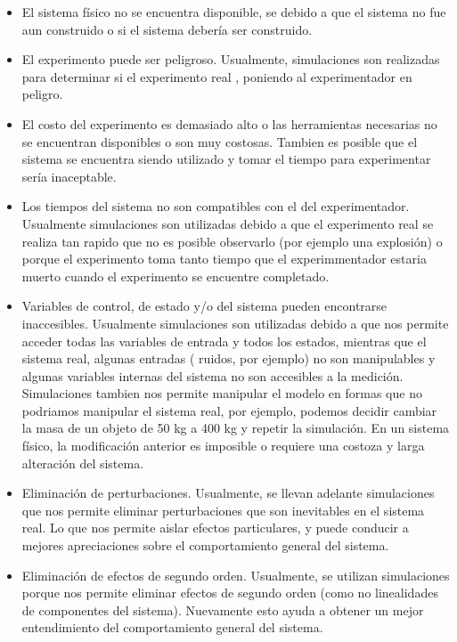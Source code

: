 \begin{itemize}
	\item El sistema físico no se encuentra disponible, se debido a que el sistema no fue aun construido o si el sistema debería ser construido. 
	
	\item El experimento puede ser peligroso. Usualmente, simulaciones son realizadas para determinar si el experimento real , poniendo al experimentador en peligro.

	\item El costo del experimento es demasiado alto o las herramientas necesarias no se encuentran disponibles o son muy costosas. Tambien es posible que el sistema se encuentra siendo utilizado y tomar el tiempo para experimentar sería inaceptable.

	\item Los tiempos del sistema no son compatibles con el del experimentador. Usualmente simulaciones son utilizadas debido a que el experimento real se realiza tan rapido que no es posible observarlo (por ejemplo una explosión) o porque el experimento toma tanto tiempo que el experimmentador estaria muerto cuando el experimento se encuentre completado.

	\item Variables de control, de estado y/o del sistema pueden encontrarse inaccesibles. Usualmente simulaciones son utilizadas debido a que nos permite acceder todas las variables de entrada y todos los estados, mientras que el sistema real, algunas entradas ( ruidos, por ejemplo) no son manipulables y algunas variables internas del sistema no son accesibles a la medición. Simulaciones tambien nos permite manipular el modelo en formas que no podriamos manipular el sistema real, por ejemplo, podemos decidir cambiar la masa de un objeto de 50 kg a 400 kg y repetir la simulación. En un sistema físico, la modificación anterior es imposible o requiere una costoza y larga alteración del sistema.

	\item Eliminación de perturbaciones. Usualmente, se llevan adelante simulaciones que nos permite eliminar perturbaciones que son inevitables en el sistema real. Lo que nos permite aislar efectos particulares, y puede conducir a mejores apreciaciones sobre el comportamiento general del sistema.

	\item Eliminación de efectos de segundo orden. Usualmente, se utilizan simulaciones porque nos permite eliminar efectos de segundo orden (como no linealidades de componentes del sistema). Nuevamente esto ayuda a obtener un mejor entendimiento del comportamiento general del sistema.
\end{itemize}

